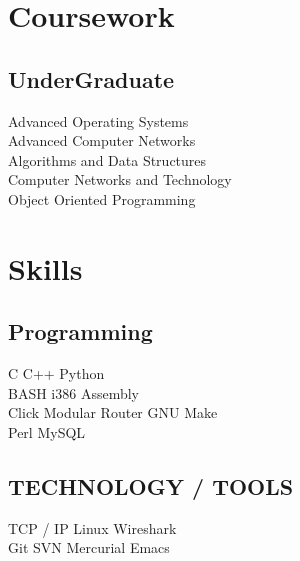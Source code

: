 \documentclass[letterpaper]{deedy-resume} %
\begin{document}
\begin{minipage}[t]{0.33\textwidth}
\section{Coursework}
\subsection{UnderGraduate}
Advanced Operating Systems \\
Advanced Computer Networks \\
Algorithms and Data Structures \\
Computer Networks and Technology \\
Object Oriented Programming \\
\sectionspace %
\section{Skills}
\subsection{Programming}
C \textbullet{} C++ \textbullet{} Python \\
BASH \textbullet{} i386 Assembly \\
Click Modular Router  \textbullet{} GNU Make \\
Perl \textbullet{} MySQL
\sectionspace %
\subsection{TECHNOLOGY / TOOLS}
TCP / IP \textbullet{} Linux \textbullet{} Wireshark \\
Git \textbullet{} SVN \textbullet{} Mercurial \textbullet{}  Emacs
\end{minipage} %
\hfill
%
%
\end{document}
